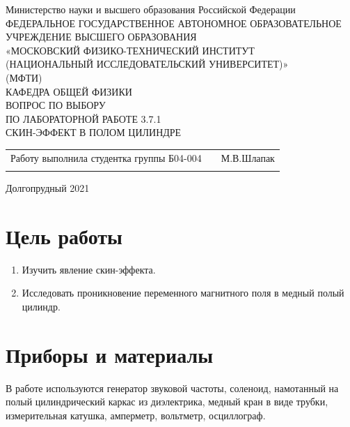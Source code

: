 \documentclass[a4paper]{article}
\begin{document}
 
 \begin{titlepage}
\begin{center}
\hfill \break
Министерство науки и высшего образования Российской Федерации\\
ФЕДЕРАЛЬНОЕ ГОСУДАРСТВЕННОЕ АВТОНОМНОЕ ОБРАЗОВАТЕЛЬНОЕ\\ 
УЧРЕЖДЕНИЕ ВЫСШЕГО ОБРАЗОВАНИЯ\\ 
«МОСКОВСКИЙ ФИЗИКО-ТЕХНИЧЕСКИЙ ИНСТИТУТ\\ 
(НАЦИОНАЛЬНЫЙ ИССЛЕДОВАТЕЛЬСКИЙ УНИВЕРСИТЕТ)»\\
(МФТИ)\\
\hfill \break
\hfill \break
\hfill \break
\hfill \break
\hfill \break
\hfill \break
\hfill \break
\hfill \break
\hfill \break
\hfill \break
\hfill \break
КАФЕДРА ОБЩЕЙ ФИЗИКИ\\
\hfill \break
ВОПРОС ПО ВЫБОРУ\\
ПО ЛАБОРАТОРНОЙ РАБОТЕ 3.7.1\\
\hfill \break
СКИН-ЭФФЕКТ В ПОЛОМ ЦИЛИНДРЕ\\
\end{center}
\hfill \break
\hfill \break
\hfill \break
\hfill \break
\hfill \break
\hfill \break
\hfill \break
\hfill \break
\begin{tabular}{ccc}
Работу выполнила студентка группы Б04-004 & \underline{\hspace{3cm}}& М.В.Шлапак \\\\
\end{tabular}
\hfill \break
\hfill \break
\hfill \break
\hfill \break
\hfill \break
\hfill \break
\hfill \break
\begin{center} Долгопрудный 2021 \end{center}
\end{titlepage}
\small
{}
\tableofcontents    
\newpage
\section{Цель работы}
\begin{enumerate}
    \item Изучить явление скин-эффекта.
    \item Исследовать проникновение переменного магнитного поля в медный полый цилиндр.
\end{enumerate}
\section{Приборы и материалы}
В работе используются генератор звуковой частоты, соленоид, намотанный на полый цилиндрический каркас из диэлектрика, медный кран в виде трубки, измерительная катушка, амперметр, вольтметр, осциллограф.
\end{document}
